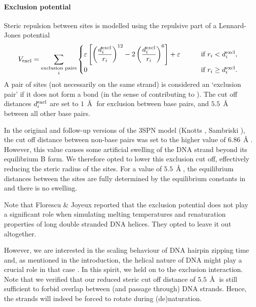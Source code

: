 \paragraph{Exclusion potential}
Steric repulsion between sites is modelled using the repulsive part of a Lennard-Jones potential
\begin{equation}
V_\text{excl}
= \sum_{\substack{\text{exclusion pairs}\\i}}
\begin{cases}
	\varepsilon \left[
		   \left(\dfrac{d^\text{excl}_i}{r_i} \right)^{12}
		- 2\left(\dfrac{d^\text{excl}_i}{r_i} \right)^{6}
       	\right] + \varepsilon
	\qquad &\text{if }r_i < d^\text{excl}_i,\\
	0
	\qquad &\text{if }r_i \geq d^\text{excl}_i.
\end{cases}
\end{equation}
A pair of sites (not necessarily on the same strand) is considered an `exclusion pair' if it does not form a bond (in the sense of contributing to \Vbond).
The cut off distances $d^\text{excl}_i$ are set to $1\,\Angstrom$ for exclusion between base pairs, and $5.5\,\Angstrom$ between all other base pairs.

In the original and follow-up versions of the 3SPN model (Knotts \etal \cite{knotts2007coarse}, Sambriski \etal \cite{sambriski2009mesoscale}), the cut off distance between non-base pairs was set to the higher value of $6.86\,\Angstrom$. However, this value causes some artificial swelling of the DNA strand beyond its equilibrium B form. We therefore opted to lower this exclusion cut off, effectively reducing the steric radius of the sites. For a value of $5.5\,\Angstrom$, the equilibrium distances between the sites are fully determined by the equilibrium constants in \Vbond and there is no swelling.

Note that Florescu \& Joyeux \cite{florescu2011thermal} reported that the exclusion potential does not play a significant role when simulating melting temperatures and renaturation properties of long double stranded DNA helices. They opted to leave it out altogether.

However, we are interested in the scaling behaviour of DNA hairpin zipping time and, as mentioned in the introduction, the helical nature of DNA might play a crucial role in that case \cite{carlon2010unwinding}.
In this spirit, we held on to the exclusion interaction. Note that we verified that our reduced steric cut off distance of $5.5\,\Angstrom$ is still sufficient to forbid overlap between (and passage through) DNA strands. Hence, the strands will indeed be forced to rotate during (de)naturation.


